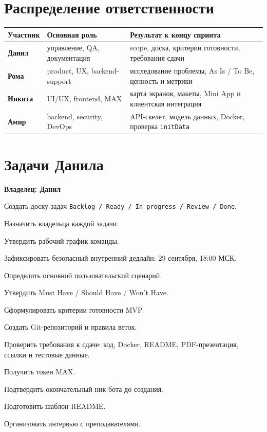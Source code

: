 \documentclass[11pt,a4paper]{article}
\newcommand{\code}[1]{\texttt{#1}}
\newcommand{\owner}[1]{\textcolor{MaxPurple}{\textbf{Владелец: #1}}}
\begin{document}
\section{Распределение ответственности}
\begin{tabularx}{\textwidth}{>{\bfseries}p{25mm}p{34mm}X}
\toprule
Участник & Основная роль & Результат к концу спринта\\
\midrule
Данил & управление, QA, документация & scope, доска, критерии готовности, требования сдачи\\
Рома & product, UX, backend-support & исследование проблемы, As Is / To Be, ценность и метрики\\
Никита & UI/UX, frontend, MAX & карта экранов, макеты, Mini App и клиентская интеграция\\
Амир & backend, security, DevOps & API-скелет, модель данных, Docker, проверка \code{initData}\\
\bottomrule
\end{tabularx}

\section{Задачи Данила}
\owner{Данил}
\begin{tasklist}
  \item Создать доску задач \code{Backlog / Ready / In progress / Review / Done}.
  \item Назначить владельца каждой задачи.
  \item Утвердить рабочий график команды.
  \item Зафиксировать безопасный внутренний дедлайн: 29 сентября, 18:00 МСК.
  \item Определить основной пользовательский сценарий.
  \item Утвердить Must Have / Should Have / Won't Have.
  \item Сформулировать критерии готовности MVP.
  \item Создать Git-репозиторий и правила веток.
  \item Проверить требования к сдаче: код, Docker, README, PDF-презентация, ссылки и тестовые данные.
  \item Получить токен MAX.
  \item Подтвердить окончательный ник бота до создания.
  \item Подготовить шаблон README.
  \item Организовать интервью с преподавателями.
\end{tasklist}
\end{document}
